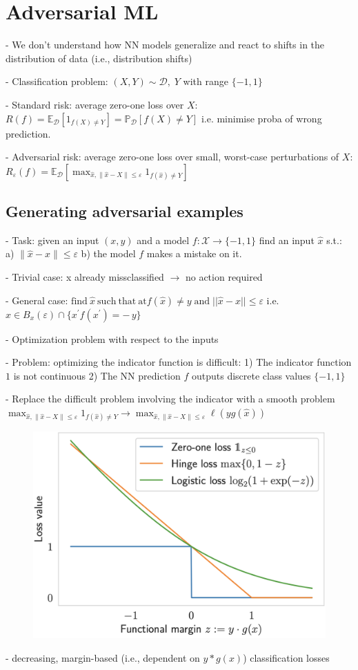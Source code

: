 \section*{Adversarial ML}

- We don't understand how NN models generalize and react to shifts in the distribution of data (i.e., distribution shifts)

- Classification problem: $(X,Y)\sim{\mathcal{D}},\;Y$ with range $\{-1,1\}$

- Standard risk: average zero-one loss over $X$: $R(f)=\mathbb{E}_{\mathcal{D}}\left[1_{f(X)\neq Y}\right]=\mathbb{P}_{\mathcal{D}}\left[f(X)\neq Y\right]$ i.e. minimise proba of wrong prediction.


- Adversarial risk: average zero-one loss over small, worst-case perturbations of $X$: $R_{\varepsilon}(f)={{{\mathbb{E}}}}_{\mathcal{D}}\left[\operatorname*{max}_{\hat{x},\|\hat{x}-X\|\leq\varepsilon}1_{f(\hat{x})\neq Y}\right]$

\subsection*{Generating adversarial examples}

- Task: given an input $(x, y)$ and a model $f : \mathcal{X}\rightarrow \{-1,1\}$ find an input $\hat{x}$ s.t.: 
a) $\|{\hat{x}}-x\|\leq\varepsilon$ b) the model $f$ makes a mistake on it.

- Trivial case: x already missclassified $\rightarrow$ no action required

- General case: ${\mathrm{find~}}{\hat{x}}~\mathrm{such~that}{\mathrm{~at}}f({\hat{x}})\neq y\operatorname{and}{\big\vert\vert}{\hat{x}}-x\vert\vert\leq\varepsilon$ i.e. $\hat{x}\in B_{x}(\varepsilon)\cap\{x^{\prime}f(x^{\prime})=-\,y\}$

- Optimization problem with respect to the inputs

- Problem: optimizing the indicator function is difficult: 1) The indicator function $1$ is not continuous 2) The NN prediction $f$ outputs discrete class values $\{-1,1\}$

- Replace the difficult problem involving the indicator with a smooth problem $\operatorname*{max}_{\hat{x},\|\hat{x}-X\|\leq\varepsilon}1_{f(\hat{x})\neq Y} \rightarrow \operatorname*{max}_{\hat{x},\|\hat{x}-X\|\leq\varepsilon}\ell(yg(\hat{x}))$

\begin{figure} 
    \centering
    \includegraphics[width=0.5\columnwidth]{figures/classification_losses.png}
\end{figure}
- decreasing, margin-based (i.e., dependent on $y * g(x)$) classification losses

